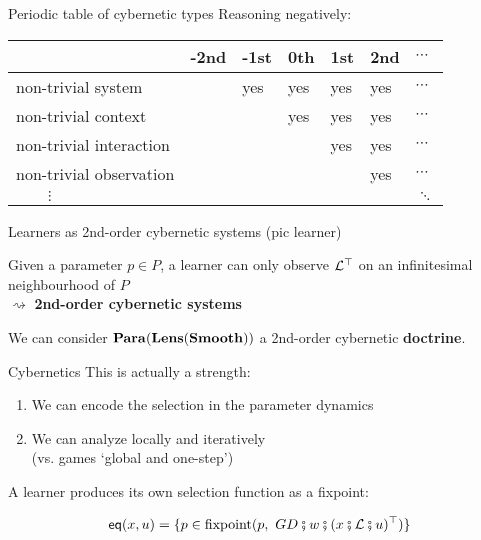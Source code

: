 \begin{frame}{Periodic table of cybernetic types}
	\vspace{-2ex}
	Reasoning negatively:
	\vspace{2ex}

	\vfill
	\begin{tabular}{p{}|p{}p{}p{}p{}p{}p{}}
		& \textbf{-2nd} & \textbf{-1st} & \textbf{0th} & \textbf{1st} & \textbf{2nd} & $\cdots$\\
		\hline
		{\color{coloraccent}non-trivial system}      &     & yes & yes & yes & yes & $\cdots$\\[2ex]
		\hline
		{\color{coloraccent}non-trivial context}     &     &     & yes & yes & yes & $\cdots$\\[2ex]
		\hline
		{\color{coloraccent}non-trivial interaction} &     &     &     & yes & yes & $\cdots$\\[2ex]
		\hline
		non-trivial observation                      &     &     &     &     & yes & $\cdots$\\[2ex]
		\hline
		$\qquad \vdots$                              &     &     &     &     &     & $\ddots$
	\end{tabular}
\end{frame}

\begin{frame}{Learners as 2nd-order cybernetic systems}
	(pic learner)

	Given a parameter $p \in P$, a learner can only observe $\mathcal{L}^\top$ on an infinitesimal neighbourhood of $P$\\
	\qquad $\rightsquigarrow$ \textbf{2nd-order cybernetic systems}

	\vfill
	We can consider $\mathbf{Para}(\mathbf{Lens}(\mathbf{Smooth}))$ a 2nd-order cybernetic \textbf{doctrine}.
\end{frame}

\begin{frame}{Cybernetics}
	This is actually a strength:
	\begin{enumerate}
		\item We can encode the selection in the parameter dynamics
		\item We can analyze locally and iteratively\\(vs. games `global and one-step')
	\end{enumerate}

	\vfill
	A learner produces its own selection function as a fixpoint:

	\begin{equation*}
		\mathsf{eq}(x,u) = \{ p \in \operatorname{fixpoint}(p,\ GD \fatsemi w \fatsemi (x \fatsemi \mathcal{L} \fatsemi u)^\top) \}
	\end{equation*}
\end{frame}
